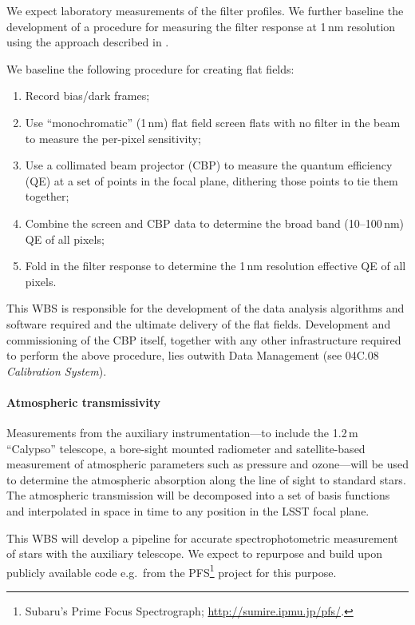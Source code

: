 \documentclass[12pt]{article}
\begin{document}
We expect laboratory measurements of the filter profiles. We further baseline the development of a procedure for measuring the filter response at 1\,nm resolution using the approach described in \cite{Lupton15}.

We baseline the following procedure for creating flat fields:

\begin{enumerate}
  \item{Record bias/dark frames;}
  \item{Use ``monochromatic'' (1\,nm) flat field screen flats with no filter in the beam to measure the per-pixel sensitivity;}
  \item{Use a collimated beam projector (CBP) to measure the quantum efficiency (QE) at a set of points in the focal plane, dithering those points to tie them together;}
  \item{Combine the screen and CBP data to determine the broad band (10--100\,nm) QE of all pixels;}
  \item{Fold in the filter response to determine the 1\,nm resolution effective QE of all pixels.}
\end{enumerate}

This WBS is responsible for the development of the data analysis algorithms and software required and the ultimate delivery of the flat fields. Development and commissioning of the CBP itself, together with any other infrastructure required to perform the above procedure, lies outwith Data Management (see 04C.08 \emph{Calibration System}).

\paragraph{Atmospheric transmissivity}

Measurements from the auxiliary instrumentation---to include the 1.2\,m ``Calypso'' telescope, a bore-sight mounted radiometer and satellite-based measurement of atmospheric parameters such as pressure and ozone---will be used to determine the atmospheric absorption along the line of sight to standard stars. The atmospheric transmission will be decomposed into a set of basis functions and interpolated in space in time to any position in the LSST focal plane.

This WBS will develop a pipeline for accurate spectrophotometric measurement of stars with the auxiliary telescope. We expect to repurpose and build upon publicly available code e.g.\ from the PFS\footnote{Subaru's Prime Focus Spectrograph; \url{http://sumire.ipmu.jp/pfs/}.} project for this purpose.
\end{document}
